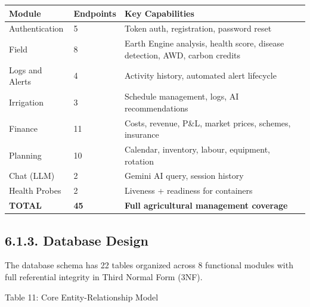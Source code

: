 \documentclass[12pt, a4paper]{report}
\begin{document}
\begin{table}[htbp]
\centering
\small
\begin{tabularx}{\textwidth}{|X|X|X|}
\hline
Module & Endpoints & Key Capabilities \\
\hline
Authentication & 5 & Token auth, registration, password reset \\
Field & 8 & Earth Engine analysis, health score, disease detection, AWD, carbon credits \\
Logs and Alerts & 4 & Activity history, automated alert lifecycle \\
Irrigation & 3 & Schedule management, logs, AI recommendations \\
Finance & 11 & Costs, revenue, P\&L, market prices, schemes, insurance \\
Planning & 10 & Calendar, inventory, labour, equipment, rotation \\
Chat (LLM) & 2 & Gemini AI query, session history \\
Health Probes & 2 & Liveness + readiness for containers \\
\textbf{TOTAL} & \textbf{45} & \textbf{Full agricultural management coverage} \\
\hline
\end{tabularx}
\end{table}

\subsection{6.1.3. Database Design}
The database schema has 22 tables organized across 8 functional modules with full referential integrity in Third Normal Form (3NF).

Table 11: Core Entity-Relationship Model
\end{document}
